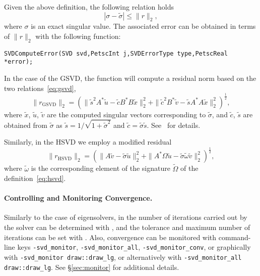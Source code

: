 Given the above definition, the following relation holds
\begin{equation}
|\sigma-\tilde{\sigma}|\leq \|r\|_2,
\end{equation}
where $\sigma$ is an exact singular value. The associated error can be obtained in terms of $\|r\|_2$ with the following function:
	\begin{Verbatim}[fontsize=\small]
	SVDComputeError(SVD svd,PetscInt j,SVDErrorType type,PetscReal *error);
	\end{Verbatim}

In the case of the GSVD, the function  will compute a residual norm based on the two relations~\eqref{eq:gsvd},
\begin{equation}
\|r_\mathrm{GSVD}\|_2=\left(\|\tilde{s}^2A^*\tilde{u}-\tilde{c}B^*B\tilde{x}\|_2^2+\|\tilde{c}^2B^*\tilde{v}-\tilde{s}A^*A\tilde{x}\|_2^2\right)^{\frac{1}{2}},
\end{equation}
where $\tilde{x}$, $\tilde{u}$, $\tilde{v}$ are the computed singular vectors corresponding to $\tilde{\sigma}$, and $\tilde{c}$, $\tilde{s}$ are obtained from $\tilde{\sigma}$ as $\tilde{s}=1/\sqrt{1+\tilde{\sigma}^2}$ and $\tilde{c}=\tilde{\sigma}\tilde{s}$. See~\citep{Alvarruiz:2022:TRL} for details.

Similarly, in the HSVD we employ a modified residual
\begin{equation}
\|r_\mathrm{HSVD}\|_2=\left(\|A\tilde{v}-\tilde{\sigma}\tilde{u}\|_2^2+\|A^*\Omega\tilde{u}-\tilde{\sigma}\tilde{\omega}\tilde{v}\|_2^2\right)^{\frac{1}{2}},
\end{equation}
where $\tilde\omega$ is the corresponding element of the signature $\tilde\Omega$ of the definition~\eqref{eq:hsvd}.

\paragraph{Controlling and Monitoring Convergence.}

Similarly to the case of eigensolvers, in  the number of iterations carried out by the solver can be determined with , and the tolerance and maximum number of iterations can be set with . Also, convergence can be monitored with command-line keys \Verb!-svd_monitor!, \Verb!-svd_monitor_all!, \Verb!-svd_monitor_conv!, or graphically with \Verb!-svd_monitor draw::draw_lg!, or alternatively with \Verb!-svd_monitor_all draw::draw_lg!. See \S\ref{sec:monitor} for additional details.

